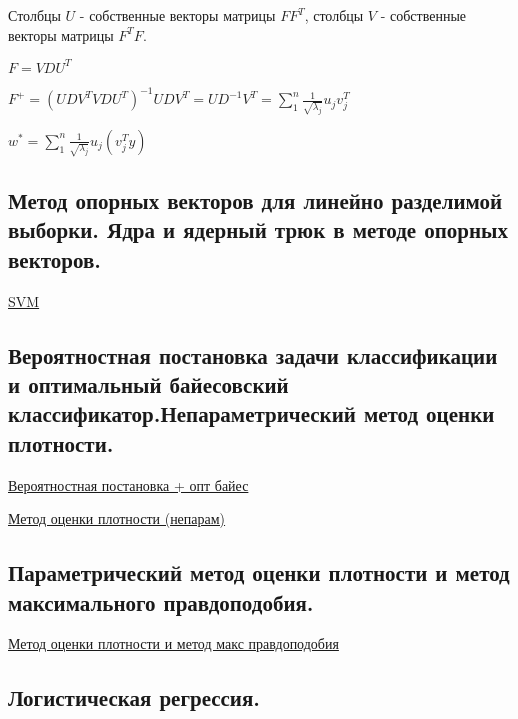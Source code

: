 \documentclass{article}
\begin{document}
Столбцы $U$ - собственные векторы матрицы $F F^T$, столбцы $V$ - собственные
векторы матрицы $F^T F$.

$F = VDU^T$

$F^+ = (U D V^T V D U^T)^{-1} U D V^T = U D^{-1} V^T = \sum\limits_1^n
\frac{1}{\sqrt{\lambda_j}} u_j v_j^T$

$w^* = \sum\limits_1^n \frac{1}{\sqrt{\lambda_j}} u_j (v_j^T y)$


\subsection{Метод опорных векторов для линейно разделимой выборки. Ядра и ядерный
трюк в методе опорных векторов.}

\href{https://neerc.ifmo.ru/wiki/index.php?title=%D0%9C%D0%B5%D1%82%D0%BE%D0%B4_%D0%BE%D0%BF%D0%BE%D1%80%D0%BD%D1%8B%D1%85_%D0%B2%D0%B5%D0%BA%D1%82%D0%BE%D1%80%D0%BE%D0%B2_(SVM)}{SVM}


\subsection{Вероятностная постановка задачи классификации и оптимальный
байесовский классификатор.Непараметрический метод оценки плотности.}

\href{
	https://neerc.ifmo.ru/wiki/index.php?title=%
}{Вероятностная постановка + опт байес}

\href{
	http://www.machinelearning.ru/wiki/index.php?title=%
}{
	Метод оценки плотности (непарам)
}


\subsection{Параметрический метод оценки плотности и метод максимального
правдоподобия.}

\href{
	http://www.machinelearning.ru/wiki/index.php?title=%
}{
	Метод оценки плотности и метод макс правдоподобия
}

\subsection{Логистическая регрессия.}
\end{document}
